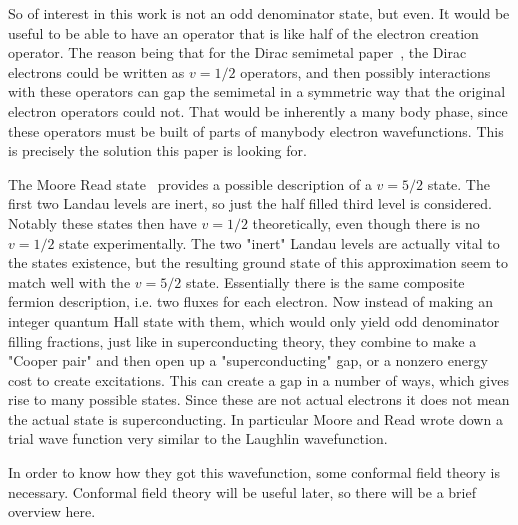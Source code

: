 So of interest in this work is not an odd denominator state, but even. It would be useful to be able to have an operator that is like half of the electron creation operator. The reason being that for the Dirac semimetal paper~\cite{RazaSirotaTeo17}, the Dirac electrons could be written as $v=1/2$ operators, and then possibly interactions with these operators can gap the semimetal in a symmetric way that the original electron operators could not. That would be inherently a many body phase, since these operators must be built of parts of manybody electron wavefunctions.  This is precisely the solution this paper is looking for.

The Moore Read state~\cite{MooreRead,ReadMoore,GreiterWenWilczekPRL91,GreiterWenWilczek91} provides a possible description of a $v=5/2$ state. The first two Landau levels are inert, so just the half filled third level is considered. Notably these states then have $v=1/2$ theoretically, even though there is no $v=1/2$ state experimentally. The two "inert" Landau levels are actually vital to the states existence, but the resulting ground state of this approximation seem to match well with the $v=5/2$ state. Essentially there is the same composite fermion description, i.e. two fluxes for each electron. Now instead of making an integer quantum Hall state with them, which would only yield odd denominator filling fractions, just like in superconducting theory, they combine to make a "Cooper pair" and then open up a "superconducting" gap, or a nonzero energy cost to create excitations. This can create a gap in a number of ways, which gives rise to many possible states. Since these are not actual electrons it does not mean the actual state is superconducting. In particular Moore and Read wrote down a trial wave function very similar to the Laughlin wavefunction.

In order to know how they got this wavefunction, some conformal field theory is necessary. Conformal field theory will be useful later, so there will be a brief overview here.

